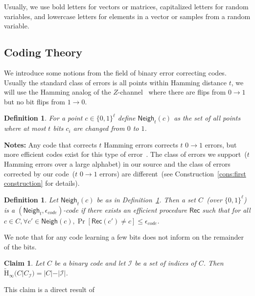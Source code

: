 \documentclass[11pt]{article}
\newcommand{\defref}[1]{\mbox{Definition~\ref{#1}}}
\newcommand{\consref}[1]{\mbox{Construction~\ref{#1}}}
\newcommand{\class}[1]{{\ensuremath{\mathsf{#1}}}}
\newcommand{\rec}{\ensuremath{\class{Rec}}\xspace}
\newcommand{\zo}{\ensuremath{\{0, 1\}}}
\newcommand{\neigh}{\ensuremath{\class{Neigh}}\xspace}
\newcommand{\Hav}{\tilde{\mathrm{H}}_\infty}
\newtheorem{definition}[theorem]{Definition}
\newtheorem{claim}[theorem]{Claim}
\begin{document}
Usually, we use bold letters for vectors or matrices, capitalized letters for random variables, and lowercase letters for elements in a vector or samples from a random variable. 

\subsection{Coding Theory}
\label{sec:coding theory}
We introduce some notions from the field of binary error correcting codes.  Usually the standard class of errors  is all points within Hamming distance $t$, we will use the Hamming analog of the $Z$-channel~\cite{tallini2002capacity} where there are flips from $0\rightarrow 1$ but no bit flips from $1\rightarrow 0$.  
\begin{definition}
\label{def:hamming z channel}
For a point $c\in \zo^\ell$ define $\neigh_t(c) $ as the set of all points where at most $t$ bits $c_i$ are changed from $0$ to $1$. 
\end{definition}
\textbf{Notes:} Any code that corrects $t$ Hamming errors corrects $t$ $0\rightarrow 1$ errors, but more efficient codes  exist for this type of error~\cite{tallini2002capacity}.
The class of errors we support~($t$ Hamming errors over a large alphabet) in our source and the class of errors corrected by our code~($t$ $0\rightarrow 1$ errors) are different~(see \consref{cons:first construction} for details).

\begin{definition}
Let $\neigh_t(c)$ be as in \defref{def:hamming z channel}.  Then a set $C$~(over $\zo^\ell$) is a $(\neigh_t, \epsilon_{code})$-code if there exists an efficient procedure $\rec$ such that for all $c\in C, \forall c'\in \neigh(c), \Pr[\rec(c') \neq c] \leq \epsilon_{code}$.
\end{definition}

We note that for any code learning a few bits does not inform on the remainder of the bits.  

\begin{claim} 
\label{cl:many locations ent}
Let $C$ be a binary code and let $\mathcal{I}$ be a set of indices of $C$.  Then $\Hav(C | C_\mathcal{I}) = |C| - |\mathcal{I}|$.
\end{claim}
This claim is a direct result of \cite[Lemma 2.2b]{DBLP:journals/siamcomp/DodisORS08}

\end{document}
